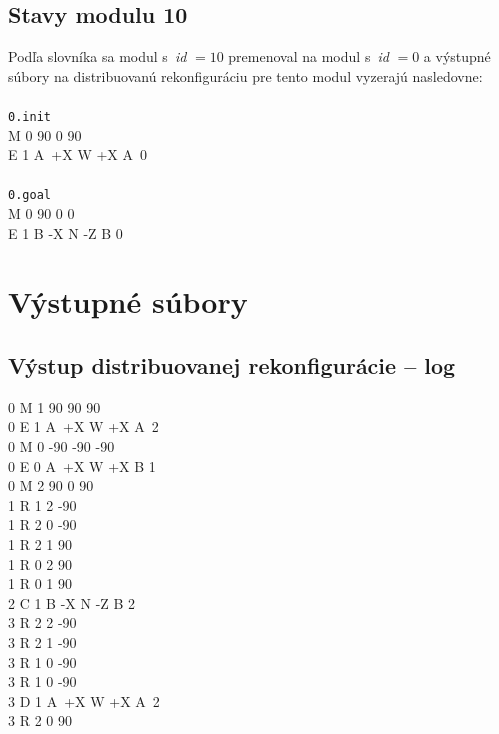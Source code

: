 \documentclass[
  printed, %
  oneside, %
  notable,   %
  nolof,     %
  nolot,     %
]{fithesis3}
\begin{document}
\subsection{Stavy modulu 10}
\label{sec:algoInput}
Podľa slovníka sa modul s~\textit{id} $= 10$ premenoval na modul s~\textit{id} $= 0$ a výstupné súbory na distribuovanú rekonfiguráciu pre tento modul vyzerajú nasledovne: \\ \\
\texttt{0.init} \\
M 0 90 0 90 \\
E 1 A~+X W +X A~0 \\
\\
\texttt{0.goal} \\
M 0 90 0 0 \\
E 1 B -X N -Z B 0 \\

\section{Výstupné súbory}
\subsection{Výstup distribuovanej rekonfigurácie -- log} 
\label{sec:log}
0 M 1 90 90 90 \\
0 E 1 A~+X W +X A~2 \\
0 M 0 -90 -90 -90 \\
0 E 0 A~+X W +X B 1 \\
0 M 2 90 0 90 \\
1 R 1 2 -90 \\
1 R 2 0 -90 \\
1 R 2 1 90 \\
1 R 0 2 90 \\
1 R 0 1 90 \\ 
2 C 1 B -X N -Z B 2 \\
3 R 2 2 -90 \\
3 R 2 1 -90 \\
3 R 1 0 -90 \\
3 R 1 0 -90 \\
3 D 1 A~+X W +X A~2 \\
3 R 2 0 90 
\end{document}
